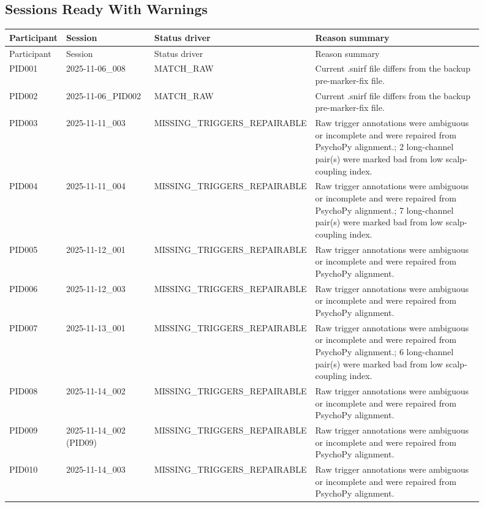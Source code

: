 \documentclass[11pt]{article}
\begin{document}
\subsection*{Sessions Ready With Warnings}
\begin{longtable}{p{0.10\linewidth}p{0.20\linewidth}p{0.20\linewidth}p{0.40\linewidth}}
\toprule
Participant & Session & Status driver & Reason summary\\
\midrule
\endfirsthead
\toprule
Participant & Session & Status driver & Reason summary\\
\midrule
\endhead
PID001 & 2025-11-06\_008 & MATCH\_RAW & Current .snirf file differs from the backup pre-marker-fix file.\\
PID002 & 2025-11-06\_PID002 & MATCH\_RAW & Current .snirf file differs from the backup pre-marker-fix file.\\
PID003 & 2025-11-11\_003 & MISSING\_TRIGGERS\_REPAIRABLE & Raw trigger annotations were ambiguous or incomplete and were repaired from PsychoPy alignment.; 2 long-channel pair(s) were marked bad from low scalp-coupling index.\\
PID004 & 2025-11-11\_004 & MISSING\_TRIGGERS\_REPAIRABLE & Raw trigger annotations were ambiguous or incomplete and were repaired from PsychoPy alignment.; 7 long-channel pair(s) were marked bad from low scalp-coupling index.\\
PID005 & 2025-11-12\_001 & MISSING\_TRIGGERS\_REPAIRABLE & Raw trigger annotations were ambiguous or incomplete and were repaired from PsychoPy alignment.\\
PID006 & 2025-11-12\_003 & MISSING\_TRIGGERS\_REPAIRABLE & Raw trigger annotations were ambiguous or incomplete and were repaired from PsychoPy alignment.\\
PID007 & 2025-11-13\_001 & MISSING\_TRIGGERS\_REPAIRABLE & Raw trigger annotations were ambiguous or incomplete and were repaired from PsychoPy alignment.; 6 long-channel pair(s) were marked bad from low scalp-coupling index.\\
PID008 & 2025-11-14\_002 & MISSING\_TRIGGERS\_REPAIRABLE & Raw trigger annotations were ambiguous or incomplete and were repaired from PsychoPy alignment.\\
PID009 & 2025-11-14\_002 (PID09) & MISSING\_TRIGGERS\_REPAIRABLE & Raw trigger annotations were ambiguous or incomplete and were repaired from PsychoPy alignment.\\
PID010 & 2025-11-14\_003 & MISSING\_TRIGGERS\_REPAIRABLE & Raw trigger annotations were ambiguous or incomplete and were repaired from PsychoPy alignment.\\

\end{longtable}
\end{document}

